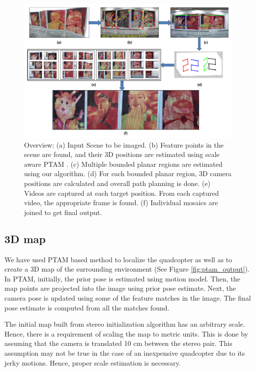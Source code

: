\begin{figure}[ht!]
\centering
\includegraphics[width=\textwidth]{figures/multiplanar/workflow}
\caption[Overall Workflow]{Overview: (a) Input Scene to be imaged. (b) Feature points in the scene
are found, and their 3D positions are estimated using scale aware PTAM \cite{engel}. (c) Multiple bounded planar
regions are estimated using our algorithm. (d) For each bounded planar region, 3D camera positions
are calculated and overall path planning is done. (e) Videos are captured at
each target position. From each captured video, the appropriate frame is
found. (f) Individual mosaics are joined to get final output.}
\label{fig:workflow}
\end{figure}
\subsection{3D map}
We have used PTAM based method \cite{engel} to localize the quadcopter as well
as to create a 3D map of the surrounding environment (See Figure \ref{fig:ptam_output}).
In PTAM, initially, the prior pose is estimated using motion model. Then, the
map points are projected into the image using prior pose estimate. Next, the camera
pose is updated using some of the feature matches in the image. The final pose
estimate is computed from all the matches found.
 
The initial map built from stereo initialization algorithm has an arbitrary
scale. Hence, there is a requirement of scaling the  map to metric units. This
is done by assuming that the camera is translated 10 cm between the stereo pair. This
assumption may not be true in the case of an inexpensive quadcopter due to its jerky
motions. Hence, proper scale estimation is necessary.


